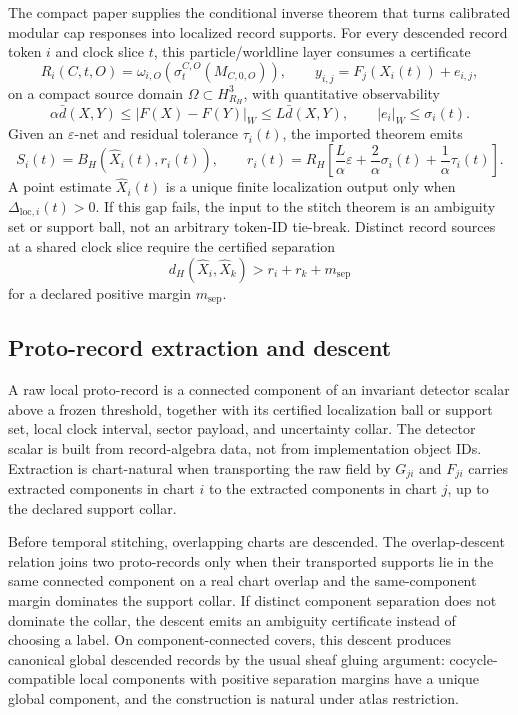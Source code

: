 \documentclass[11pt]{article}
\begin{document}
The compact paper supplies the conditional inverse theorem that turns calibrated modular cap
responses into localized record supports. For every descended record token \(i\) and clock slice
\(t\), this particle/worldline layer consumes a certificate
\[
R_i(C,t,O)=\omega_{i,O}\!\left(\sigma_t^{C,O}(M_{C,0,O})\right),
\qquad
y_{i,j}=F_j(X_i(t))+e_{i,j},
\]
on a compact source domain \(\Omega\subset H^3_{R_H}\), with quantitative observability
\[
\alpha\bar d(X,Y)\le |F(X)-F(Y)|_W\le L\bar d(X,Y),
\qquad |e_i|_W\le\sigma_i(t).
\]
Given an \(\varepsilon\)-net and residual tolerance \(\tau_i(t)\), the imported theorem emits
\[
S_i(t)=B_H(\widehat X_i(t),r_i(t)),
\qquad
r_i(t)=R_H\left[
\frac L\alpha\varepsilon+\frac2\alpha\sigma_i(t)+\frac1\alpha\tau_i(t)
\right].
\]
A point estimate \(\widehat X_i(t)\) is a unique finite localization output only when
\(\Delta_{\mathrm{loc},i}(t)>0\). If this gap fails, the input to the stitch theorem is an
ambiguity set or support ball, not an arbitrary token-ID tie-break. Distinct record sources at a
shared clock slice require the certified separation
\[
d_H(\widehat X_i,\widehat X_k)>r_i+r_k+m_{\mathrm{sep}}
\]
for a declared positive margin \(m_{\mathrm{sep}}\).

\subsection{Proto-record extraction and descent}

A raw local proto-record is a connected component of an invariant detector scalar above a frozen
threshold, together with its certified localization ball or support set, local clock interval,
sector payload, and uncertainty collar.
The detector scalar is built from record-algebra data, not from implementation object IDs. Extraction is
chart-natural when transporting the raw field by \(G_{ji}\) and \(F_{ji}\) carries extracted
components in chart \(i\) to the extracted components in chart \(j\), up to the declared support
collar.

Before temporal stitching, overlapping charts are descended. The overlap-descent relation joins
two proto-records only when their transported supports lie in the same connected component on a
real chart overlap and the same-component margin dominates the support collar. If distinct
component separation does not dominate the collar, the descent emits an ambiguity certificate
instead of choosing a label. On component-connected covers, this descent produces canonical
global descended records by the usual sheaf gluing argument: cocycle-compatible local components
with positive separation margins have a unique global component, and the construction is natural
under atlas restriction.
\end{document}
